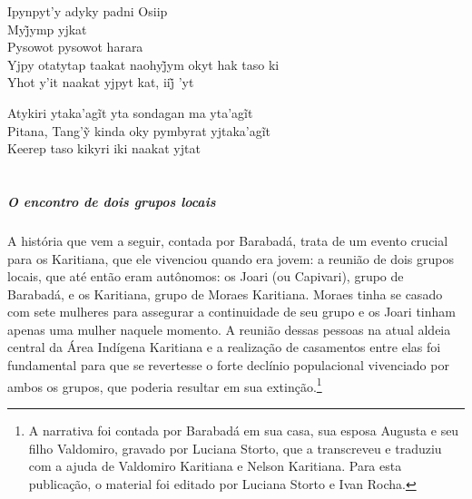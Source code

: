  \smallskip
 \begin{center}\end{center}
 \smallskip
 
\noindent   Ipynpyt'y adyky padni Osiip\\
  Myj̃ymp yjkat\\
  Pysowot pysowot harara\\
  Yjpy otatytap taakat naohyj̃ym okyt hak taso ki\\
  Yhot y’it naakat yjpyt kat, iij̃ ’yt
 
 \smallskip
 \begin{center}\end{center}
 \smallskip
 
\noindent   Atykiri ytaka’agĩt yta sondagan ma yta’agĩt\\
  Pitana, Tang’ỹ kinda oky pymbyrat yjtaka’agĩt\\
  Keerep taso kikyri iki naakat yjtat

\chapter*{}
\thispagestyle{empty}
\vspace*{\fill}
\paragraph{O encontro de dois grupos locais}
A história que vem a seguir, contada por Barabadá, trata de um evento crucial para
os Karitiana, que ele vivenciou quando era jovem: a reunião de dois
grupos locais, que até então eram autônomos: os Joari (ou Capivari),
grupo de Barabadá, e os Karitiana, grupo de Moraes Karitiana. Moraes
tinha se casado com sete mulheres para assegurar a continuidade de seu
grupo e os Joari tinham apenas uma mulher naquele momento. A reunião
dessas pessoas na atual aldeia central da Área Indígena Karitiana e a
realização de casamentos entre elas foi fundamental para que se
revertesse o forte declínio populacional vivenciado por ambos os grupos,
que poderia resultar em sua extinção.\footnote{A narrativa foi contada por Barabadá em sua casa, sua esposa Augusta e
seu filho Valdomiro, gravado por Luciana Storto, que a transcreveu e
traduziu com a ajuda de Valdomiro Karitiana e Nelson Karitiana. Para
esta publicação, o material foi editado por Luciana Storto e Ivan Rocha.}


